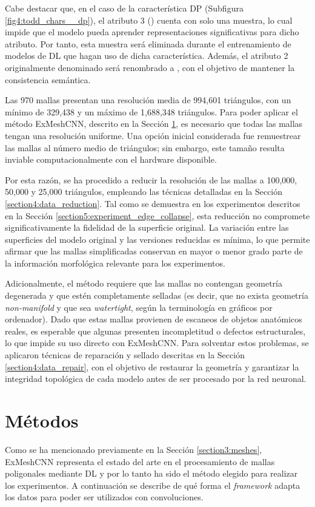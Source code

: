Cabe destacar que, en el caso de la característica DP (Subfigura \ref{fig4:todd_chars__dp}), el atributo 3 () cuenta con solo una muestra, lo cual impide que el modelo pueda aprender representaciones significativas para dicho atributo. Por tanto, esta muestra será eliminada durante el entrenamiento de modelos de DL que hagan uso de dicha característica. Además, el atributo 2 originalmente denominado  será renombrado a , con el objetivo de mantener la consistencia semántica.

Las 970 mallas presentan una resolución media de 994,601 triángulos, con un mínimo de 329,438 y un máximo de 1,688,348 triángulos. Para poder aplicar el método ExMeshCNN, descrito en la Sección \ref{section4:methods}, es necesario que todas las mallas tengan una resolución uniforme. Una opción inicial considerada fue remuestrear las mallas al número medio de triángulos; sin embargo, este tamaño resulta inviable computacionalmente con el hardware disponible.

Por esta razón, se ha procedido a reducir la resolución de las mallas a 100,000, 50,000 y 25,000 triángulos, empleando las técnicas detalladas en la Sección \ref{section4:data_reduction}. Tal como se demuestra en los experimentos descritos en la Sección \ref{section5:experiment_edge_collapse}, esta reducción no compromete significativamente la fidelidad de la superficie original. La variación entre las superficies del modelo original y las versiones reducidas es mínima, lo que permite afirmar que las mallas simplificadas conservan en mayor o menor grado parte de la información morfológica relevante para los experimentos.

Adicionalmente, el método requiere que las mallas no contengan geometría degenerada y que estén completamente selladas (es decir, que no exista geometría \textit{non-manifold} y que sea \textit{watertight}, según la terminología en gráficos por ordenador). Dado que estas mallas provienen de escaneos de objetos anatómicos reales, es esperable que algunas presenten incompletitud o defectos estructurales, lo que impide su uso directo con ExMeshCNN. Para solventar estos problemas, se aplicaron técnicas de reparación y sellado descritas en la Sección \ref{section4:data_repair}, con el objetivo de restaurar la geometría y garantizar la integridad topológica de cada modelo antes de ser procesado por la red neuronal.

\section{Métodos}
\label{section4:methods}
Como se ha mencionado previamente en la Sección \ref{section3:meshes}, ExMeshCNN \cite{kim_exmeshcnn_2022} representa el estado del arte en el procesamiento de mallas poligonales mediante DL y por lo tanto ha sido el método elegido para realizar los experimentos. A continuación se describe de qué forma el \textit{framework} adapta los datos para poder ser utilizados con convoluciones.

